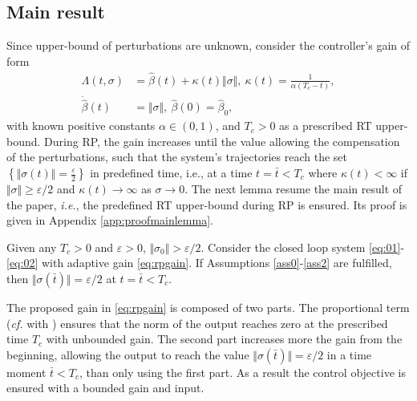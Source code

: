 \documentclass[twocolumn]{autart}    %
\begin{document}
\subsection{Main result}
\vspace{-3mm}
Since upper-bound of perturbations are unknown,  consider the controller's gain of form\vspace{-3pt}
\begin{equation}\label{eq:rpgain}
\begin{aligned}
\Lambda(t,\sigma)&=\hat{\beta}(t)+\kappa(t)\Vert \sigma \Vert,\:  \kappa(t)=\tfrac{1}{\alpha(T_c-t)}, \\
\dot{\hat{\beta}}(t)&=\Vert \sigma \Vert,\: \hat{\beta}(0)=\hat{\beta}_0, 
\end{aligned}
\end{equation} with known positive constants $\alpha\in (0,1)$,  and $T_c>0$ as a prescribed RT upper-bound.  During RP, the gain increases until the value allowing the compensation of the perturbations, such that the system's trajectories reach the set $\left\lbrace \Vert \sigma(t)\Vert = \frac{\varepsilon}{2} \right\rbrace$ in predefined time, i.e., at a time $t=\bar{t}<T_c$ where $\kappa(t)<\infty$ if $\Vert \sigma \Vert \geq \varepsilon /2$ and $\kappa(t)\rightarrow\infty$ as $\sigma \rightarrow 0$. The next lemma resume the main result of the paper, \textit{i.e.},  the predefined RT upper-bound during RP is ensured. Its proof is given in Appendix \ref{app:proofmainlemma}.
\begin{lem}\label{lem:main}
Given any $T_c>0$ and $\varepsilon>0$, $\Vert \sigma_0 \Vert>\varepsilon/2$.  Consider the closed loop system \eqref{eq:01}-\eqref{eq:02} with adaptive gain \eqref{eq:rpgain}. If Assumptions \ref{ass0}-\ref{ass2} are fulfilled, then $\Vert \sigma(\bar{t}) \Vert =\varepsilon/2$ at $t=\bar{t}< T_c$.
\end{lem}
\begin{rem}
The proposed gain in \eqref{eq:rpgain} is composed of two parts.  The proportional term (\textit{cf. }with \cite{gomez2020,holloway2019}) ensures that the norm of the output reaches zero at the prescribed time $T_c$ with unbounded gain. The second part increases more the gain from the beginning,  allowing the output to reach the value $\Vert \sigma(\bar{t}) \Vert = \varepsilon/2$ in a time moment $\bar{t}<T_c$, than only using the first part.  As a result the control objective is ensured with a bounded gain and input.
\end{rem}\vspace{-4pt}
\end{document}
